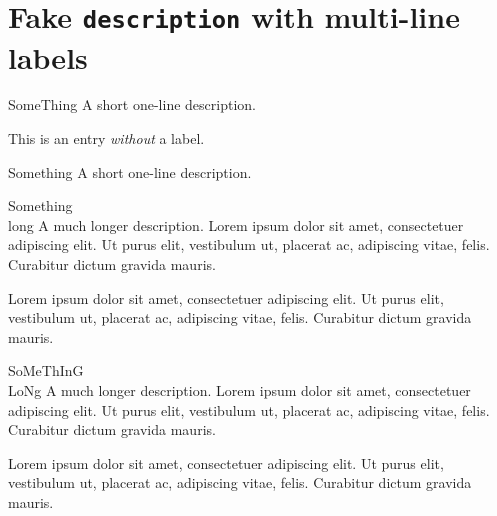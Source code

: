 \documentclass{article}
\newlength{\descitemwd}
\begin{document}
\section{Fake \texttt{description} with multi-line labels}

\begin{enumext}[label={},labelsep=4pt,labelwidth=\descitemwd,list-offset=-\dimeval{\descitemwd+4pt}, wrap-label*={\labelbx{#1}}, font=\bfseries,noitemsep,topsep=3pt]
  \item[SomeThing] A short one-line description.
  \item This is an entry \textit{without} a label.
  \item[Something] A short one-line description.
  \item[Something \\ long] A much longer description. Lorem ipsum dolor sit amet, consectetuer adipiscing elit.
    Ut purus elit, vestibulum ut, placerat ac, adipiscing vitae, felis.
    Curabitur dictum gravida mauris.

    Lorem ipsum dolor sit amet, consectetuer adipiscing elit.
    Ut purus elit, vestibulum ut, placerat ac, adipiscing vitae, felis.
    Curabitur dictum gravida mauris.

  \item[SoMeThInG \\ LoNg] A much longer description. Lorem ipsum dolor sit amet, consectetuer adipiscing elit.
    Ut purus elit, vestibulum ut, placerat ac, adipiscing vitae, felis.
    Curabitur dictum gravida mauris.

    Lorem ipsum dolor sit amet, consectetuer adipiscing elit.
    Ut purus elit, vestibulum ut, placerat ac, adipiscing vitae, felis.
    Curabitur dictum gravida mauris.
\end{enumext}
\end{document}
